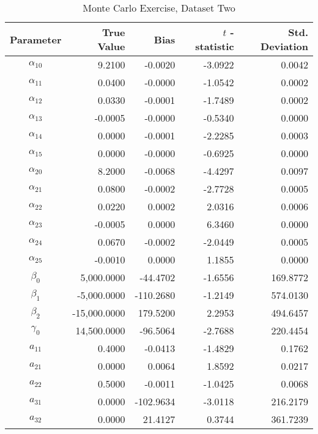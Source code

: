 \begin{table}\onehalfspacing
\begin{center}
\begin{threeparttable}
  \caption{Monte Carlo Exercise, Dataset Two}
  \label{Monte Carlo: Two}
  \begin{tabular}{crrrr}\toprule

  Parameter & True Value & Bias & $t$ - statistic & Std. Deviation \\
  \midrule
  $\alpha_{10}$ &      \phantom{20000}9.2100 &  -0.0020 & -3.0922 &     0.0042 \\
  $\alpha_{11}$ &      0.0400 & -0.0000 & -1.0542 & 0.0002 \\ 
  $\alpha_{12}$ &      0.0330 &  -0.0001 & -1.7489 & 0.0002 \\
  $\alpha_{13}$ &      -0.0005 & -0.0000 & -0.5340 & 0.0000 \\
  $\alpha_{14}$ &      0.0000 & -0.0001 & -2.2285 & 0.0003 \\
  $\alpha_{15}$ &      0.0000 & -0.0000 & -0.6925 & 0.0000 \\
  $\alpha_{20}$ &      8.2000 & -0.0068 & -4.4297 & 0.0097 \\
  $\alpha_{21}$ &      0.0800 & -0.0002 & -2.7728 & 0.0005 \\
  $\alpha_{22}$ &      0.0220 & 0.0002 & 2.0316 & 0.0006 \\
  $\alpha_{23}$ &      -0.0005 & 0.0000 & 6.3460 & 0.0000 \\
  $\alpha_{24}$ &      0.0670 & -0.0002 & -2.0449 & 0.0005 \\
  $\alpha_{25}$ &      -0.0010 & 0.0000 & 1.1855 & 0.0000 \\
  $\beta_{0}$   &   5,000.0000 & -44.4702 & -1.6556 &  169.8772\\
  $\beta_{1}$   &   -5,000.0000 & -110.2680 & -1.2149 & 574.0130 \\
  $\beta_{2}$   &  -15,000.0000 & 179.5200 & 2.2953 & 494.6457 \\
  $\gamma_{0}$  &  14,500.0000 & -96.5064 & -2.7688 & 220.4454 \\
  $a_{11}$      &      0.4000 & -0.0413 & -1.4829 & 0.1762 \\
  $a_{21}$      &      0.0000 & 0.0064 & 1.8592 & 0.0217 \\
  $a_{22}$      &      0.5000 & -0.0011 & -1.0425 & 0.0068 \\
  $a_{31}$      &      0.0000 & -102.9634 & -3.0118 & 216.2179 \\
  $a_{32}$      &      0.0000 &  21.4127 & 0.3744 & 361.7239 \\

\end{tabular}
\end{threeparttable}
\end{center}
\end{table}

